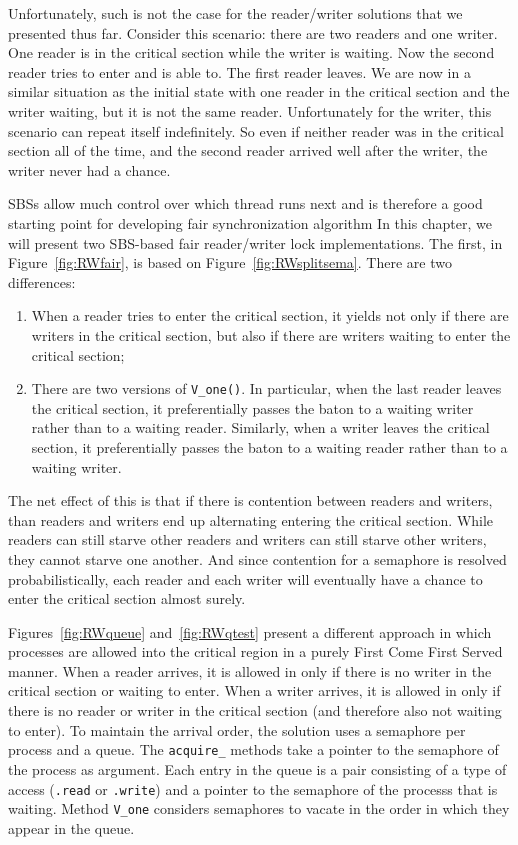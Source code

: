 \documentclass{report}
\begin{document}

Unfortunately, such is not the case for the
reader/writer solutions that we presented thus far.
Consider this scenario: there are two readers and one writer.  One reader
is in the critical section while the writer is waiting.  Now the
second reader tries to enter and is able to.  The first reader leaves.
We are now in a similar situation as the initial state with one reader
in the critical section and the writer waiting, but it is not the same
reader.  Unfortunately for the writer, this scenario can repeat itself
indefinitely.  So even if neither reader was in the critical section
all of the time, and the second reader arrived well after the writer,
the writer never had a chance.

SBSs allow much control over which thread runs next and is therefore a
good starting point for developing fair synchronization algorithm
In this chapter, we will present two SBS-based fair reader/writer lock
implementations.
The first, in Figure~\ref{fig:RWfair}, is based on Figure~\ref{fig:RWsplitsema}.
There are two differences:

\begin{enumerate}
\item When a reader tries to enter the critical section, it yields not only
if there are writers in the critical section, but also if there are writers
waiting to enter the critical section;
\item There are two versions of \texttt{V\_one()}.  In particular, when the
last reader leaves the critical section, it preferentially passes the baton
to a waiting writer rather than to a waiting reader.  Similarly,
when a writer leaves the critical section, it preferentially passes
the baton to a waiting reader rather than to a waiting writer.
\end{enumerate}

The net effect of this is that if there is contention between readers and
writers, than readers and writers end up alternating entering the critical
section.  While readers can still starve other readers and writers can still
starve other writers, they cannot starve one another.  And since contention for
a semaphore is resolved probabilistically, each reader and each writer will
eventually have a chance to enter the critical section almost surely.

Figures~\ref{fig:RWqueue} and~\ref{fig:RWqtest} present a different approach
in which processes are allowed into the critical region in a purely First
Come First Served manner.  When a reader arrives, it is allowed in only if
there is no writer in the critical section or waiting to enter.  When a writer
arrives, it is allowed in only if there is no reader or writer in the
critical section (and therefore also not waiting to enter).  To maintain the
arrival order, the solution uses a semaphore per process and a queue.
The \texttt{acquire\_} methods take a pointer to
the semaphore of the process as argument.
Each entry in the queue is a pair consisting of a type of access
(\texttt{.read} or \texttt{.write}) and a pointer to the semaphore of the
processs that is waiting.  Method \texttt{V\_one} considers semaphores to vacate
in the order in which they appear in the queue.
\end{document}
